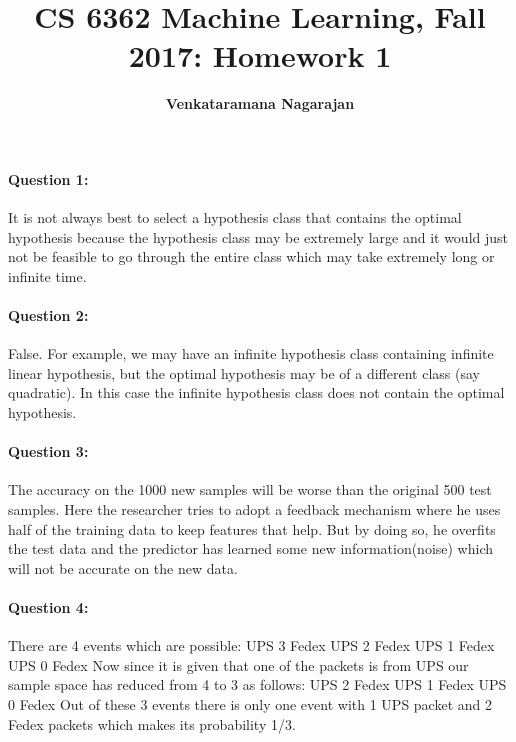 \documentclass[letterpaper,11pt]{article}
\title{CS 6362 Machine Learning, Fall 2017: Homework 1}
\date{}
\author{\bf Venkataramana Nagarajan}
\begin{document}
\maketitle

\paragraph{Question 1:} It is not always best to select a hypothesis class that contains the optimal hypothesis because the hypothesis class may be extremely large and it would just not be feasible to go through the entire class which may take extremely long or infinite time.

\paragraph{Question 2:} False. For example, we may have an infinite hypothesis class containing infinite linear hypothesis, but the optimal hypothesis may be of a different class (say quadratic). In this case the infinite hypothesis class does not contain the optimal hypothesis.

\paragraph{Question 3:} The accuracy on the 1000 new samples will be worse than the original 500 test samples. Here the researcher tries to adopt a feedback mechanism where he uses half of the training data to keep features that help. But by doing so, he overfits the test data and the predictor has learned some new information(noise) which will not be accurate on the new data.

\paragraph{Question 4:} There are 4 events which are possible: \newline {} UPS 3 Fedex  UPS 2 Fedex  UPS 1 Fedex  UPS 0 Fedex \newline \newline Now since it is given that one of the packets is from UPS our sample space has reduced from 4 to 3 as follows: \newline {} UPS 2 Fedex  UPS 1 Fedex  UPS 0 Fedex \newline \newline Out of these 3 events there is only one event with 1 UPS packet and 2 Fedex packets which makes its probability 1/3.
\end{document}
